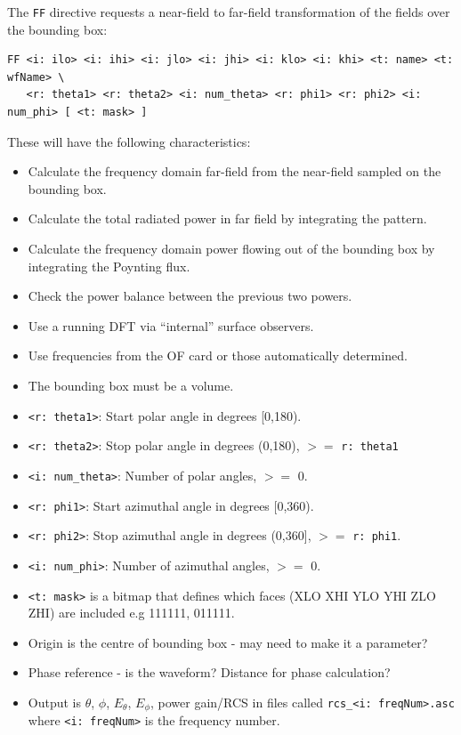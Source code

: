 \documentclass[onecolumn,a4paper]{article}
\numberwithin{equation}{section}
\begin{document}
{\color{red}
The \texttt{FF} directive requests a near-field to far-field transformation of the 
fields over the bounding box:
\begin{verbatim}
FF <i: ilo> <i: ihi> <i: jlo> <i: jhi> <i: klo> <i: khi> <t: name> <t: wfName> \
   <r: theta1> <r: theta2> <i: num_theta> <r: phi1> <r: phi2> <i: num_phi> [ <t: mask> ]
\end{verbatim}

These will have the following characteristics:
\begin{itemize}
 \item Calculate the frequency domain far-field from the near-field sampled on the bounding box.
 \item Calculate the total radiated power in far field by integrating the pattern.
 \item Calculate the frequency domain power flowing out of the bounding box by integrating the
 Poynting flux.
 \item Check the power balance between the previous two powers.
 \item Use a running DFT via ``internal'' surface observers.
 \item Use frequencies from the OF card or those automatically determined.
 \item The bounding box must be a volume.
 \item \texttt{<r:~theta1>}: Start polar angle in degrees [0,180).
 \item \texttt{<r:~theta2>}: Stop polar angle in degrees (0,180), $>=$ \texttt{r:~theta1}
 \item \texttt{<i:~num\_theta>}: Number of polar angles, $>=$ 0.
 \item \texttt{<r:~phi1>}: Start azimuthal angle in degrees [0,360).
 \item \texttt{<r:~phi2>}: Stop azimuthal angle in degrees (0,360], $>=$ \texttt{r:~phi1}.
 \item \texttt{<i: num\_phi>}: Number of azimuthal angles, $>=$ 0.
 \item \texttt{<t:~mask>} is a bitmap that defines which faces (XLO XHI YLO YHI ZLO ZHI) are included e.g 111111, 011111.
 \item Origin is the centre of bounding box - may need to make it a parameter?
 \item Phase reference - is the waveform? Distance for phase calculation?
 \item Output is $\theta$, $\phi$, $E_\theta$, $E_\phi$, power gain/RCS 
 in files called \texttt{rcs\_<i:~freqNum>.asc} where \texttt{<i:~freqNum>} is the frequency number.
\end{itemize}
}
\end{document}
